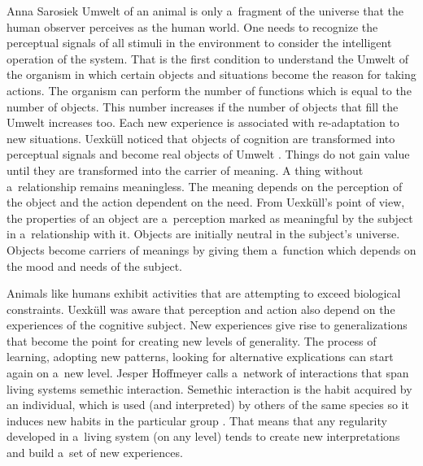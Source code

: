 \begin{artengenv}{Anna Sarosiek}
Umwelt of an animal is only a~fragment of the universe that the human observer perceives as the human world. One needs to recognize the perceptual signals of all stimuli in the environment to consider the intelligent operation of the system. That is the first condition to understand the Umwelt of the organism in which certain objects and situations become the reason for taking actions. The organism can perform the number of functions which is equal to the number of objects. This number increases if the number of objects that fill the Umwelt increases too. Each new experience is associated with re-adaptation to new situations. Uexküll noticed that objects of cognition are transformed into perceptual signals and become real objects of Umwelt
\parencite[][]{uexkull_streifzuge_1934}. %
 Things do not gain value until they are transformed into the carrier of meaning. A thing without a~relationship remains meaningless. The meaning depends on the perception of the object and the action dependent on the need. From Uexküll's point of view, the properties of an object are a~perception marked as meaningful by the subject in a~relationship with it. Objects are initially neutral in the subject's universe. Objects become carriers of meanings by giving them a~function which depends on the mood and needs of the subject.

Animals like humans exhibit activities that are attempting to exceed biological constraints. Uexküll was aware that perception and action also depend on the experiences of the cognitive subject. New experiences give rise to generalizations that become the point for creating new levels of generality. The process of learning, adopting new patterns, looking for alternative explications can start again on a~new level. Jesper Hoffmeyer calls a~network of interactions that span living systems semethic interaction. Semethic interaction is the habit acquired by an individual, which is used (and interpreted) by others of the same species so it induces new habits in the particular group
\parencite[][]{hoffmeyer_unfolding_1998}. %
 That means that any regularity developed in a~living system (on any level) tends to create new interpretations and build a~set of new experiences.


\end{artengenv}
